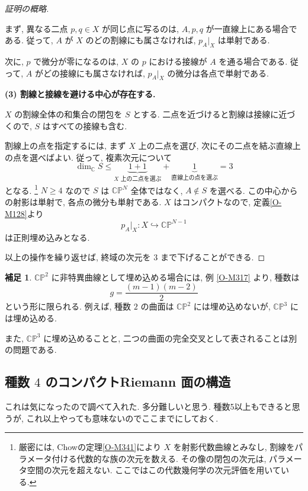 \documentclass[dvipdfmx,a4paper,11pt]{article} %
\newcommand{\C}{\mathbb{C}}
\theoremstyle{definition}
\numberwithin{equation}{section}
\newtheorem{rem}[thm]{補足}
\begin{document}
\begin{proof}[証明の概略]
\begin{figure}[htbp]
\label{fig-projection-secant-tangent}
\end{figure}

まず, 異なる二点 $p,q\in X$ が同じ点に写るのは,
$A,p,q$ が一直線上にある場合である.
従って, $A$ が $X$ のどの割線にも属さなければ,
$p_A|_X$ は単射である.

次に, $p$ で微分が零になるのは,
$X$ の $p$ における接線が $A$ を通る場合である.
従って, $A$ がどの接線にも属さなければ,
$p_A|_X$ の微分は各点で単射である.

\medskip
\noindent
\textbf{(3) 割線と接線を避ける中心が存在する.}

$X$ の割線全体の和集合の閉包を $S$ とする.
二点を近づけると割線は接線に近づくので,
$S$ はすべての接線も含む.

割線上の点を指定するには,
まず $X$ 上の二点を選び,
次にその二点を結ぶ直線上の点を選べばよい.
従って, 複素次元について
\[
\dim_{\C}S
\leq
\underbrace{1+1}_{\text{$X$ 上の二点を選ぶ}}
+
\underbrace{1}_{\text{直線上の点を選ぶ}}
=3
\]
となる.
\footnote{
厳密には, Chowの定理\ref{O-M341}により $X$ を射影代数曲線とみなし,
割線をパラメータ付ける代数的な族の次元を数える.
その像の閉包の次元は, パラメータ空間の次元を超えない.
ここではこの代数幾何学の次元評価を用いている.
}
$N\geq4$ なので $S$ は $\C\mathbb P^N$ 全体ではなく,
$A\notin S$ を選べる.
この中心からの射影は単射で, 各点の微分も単射である.
$X$ はコンパクトなので,
定義\ref{O-M128}より
\[
p_A|_X:X\hookrightarrow\C\mathbb P^{N-1}
\]
は正則埋め込みとなる.

以上の操作を繰り返せば,
終域の次元を $3$ まで下げることができる.
\end{proof}


\begin{rem}
$\C\mathbb P^2$ に非特異曲線として埋め込める場合には, 
例 \ref{O-M317} より, 種数は
\[
g=\frac{(m-1)(m-2)}2
\]
という形に限られる.
例えば, 種数 $2$ の曲面は
$\C\mathbb P^2$ には埋め込めないが, 
$\C\mathbb P^3$ には埋め込める.

また, $\C\mathbb P^3$ に埋め込めることと, 
二つの曲面の完全交叉として表されることは別の問題である.
\end{rem}


\subsection{種数 $4$ のコンパクトRiemann 面の構造}
これは気になったので調べて入れた. 多分難しいと思う. 
種数5以上もできると思うが, これ以上やっても意味ないのでここまでにしておく. 
\end{document}
